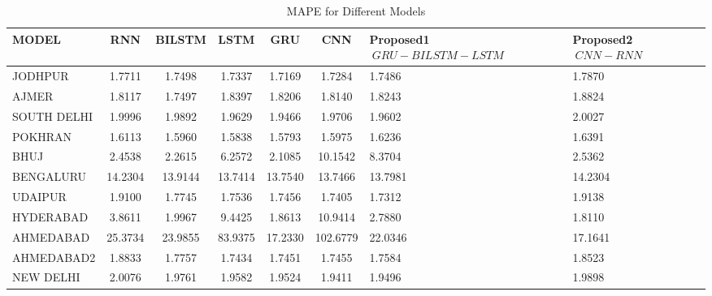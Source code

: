 \documentclass[a4paper,fleqn]{cas-sc}
\begin{document}
\begin{table}[!ht]
\centering
\caption{MAPE  for Different Models}
\begin{tabular}{|l|c|c|c|c|c|p{}|p{}|}
\hline
\textbf{MODEL} & \textbf{RNN} & \textbf{BILSTM} & \textbf{LSTM} & \textbf{GRU} & \textbf{CNN} &\textbf{Proposed1 \(\ GRU-BILSTM-LSTM \)\ } & \textbf{Proposed2 \(\ CNN-RNN\)\ } \\ \hline
JODHPUR & 1.7711 & 1.7498 & 1.7337 & 1.7169 & 1.7284 & 1.7486 & 1.7870 \\ \hline
AJMER & 1.8117 & 1.7497 & 1.8397 & 1.8206 & 1.8140 & 1.8243 & 1.8824 \\ \hline
SOUTH DELHI & 1.9996 & 1.9892 & 1.9629 & 1.9466 & 1.9706 & 1.9602 & 2.0027 \\ \hline
POKHRAN & 1.6113 & 1.5960 & 1.5838 & 1.5793 & 1.5975 & 1.6236 & 1.6391 \\ \hline
BHUJ & 2.4538 & 2.2615 & 6.2572 & 2.1085 & 10.1542 & 8.3704 & 2.5362 \\ \hline
BENGALURU & 14.2304 & 13.9144 & 13.7414 & 13.7540 & 13.7466 & 13.7981 & 14.2304 \\ \hline
UDAIPUR & 1.9100 & 1.7745 & 1.7536 & 1.7456 & 1.7405 & 1.7312 & 1.9138 \\ \hline
HYDERABAD & 3.8611 & 1.9967 & 9.4425 & 1.8613 & 10.9414 & 2.7880 & 1.8110 \\ \hline
AHMEDABAD & 25.3734 & 23.9855 & 83.9375 & 17.2330 & 102.6779 & 22.0346 & 17.1641 \\ \hline
AHMEDABAD2 & 1.8833 & 1.7757 & 1.7434 & 1.7451 & 1.7455 & 1.7584 & 1.8523 \\ \hline
NEW DELHI & 2.0076 & 1.9761 & 1.9582 & 1.9524 & 1.9411 & 1.9496 & 1.9898 \\ \hline

\end{tabular}
\end{table}
\end{document}
